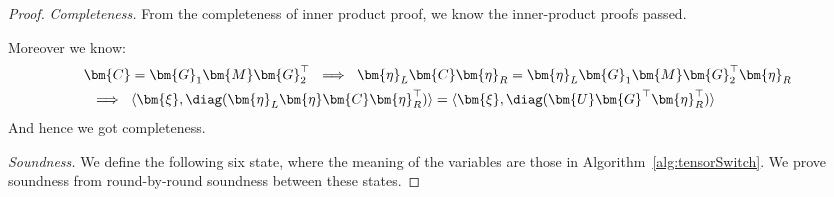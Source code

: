 \begin{proof}
\emph{Completeness.}
From the completeness of inner product proof, we know the inner-product proofs passed.

Moreover we know:
\begin{align*}
& \bm{C} = \bm{G}_1\bm{M}\bm{G}_2^\top
~\implies~
 \bm{\eta}_L \bm{C} \bm{\eta}_R = \bm{\eta}_L\bm{G}_1\bm{M}\bm{G}_2^\top\bm{\eta}_R
\\&
~\implies~
 \langle \bm{\xi}, \mathsf{\diag}(\bm{\eta}_L\bm{\eta}\bm{C}\bm{\eta}_R^\top) \rangle
=\langle \bm{\xi}, \mathsf{\diag}(\bm{U}\bm{G}^\top\bm{\eta}_R^\top) \rangle
\end{align*}
And hence we got completeness.

\medskip \noindent
\emph{Soundness.}
We define the following six state, where the meaning of the variables are those in Algorithm~\ref{alg:tensorSwitch}.
We prove soundness from round-by-round soundness between these states.


\end{proof}
